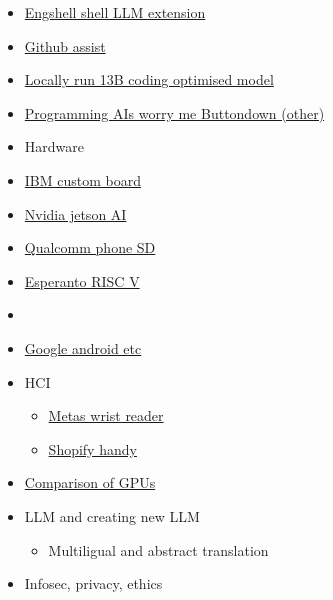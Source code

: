 \begin{itemize}
\item
  \href{https://github.com/emcf/engshell/tree/main}{Engshell shell LLM
  extension}
\item
  \href{https://useadrenaline.com/app}{Github assist}
\item
  \href{https://huggingface.co/ehartford/alpaca1337-13b-4bit/tree/main}{Locally
  run 13B coding optimised model}
\item
  \href{https://buttondown.email/hillelwayne/archive/programming-ais-worry-me/}{Programming
  AIs worry me   Buttondown (other)}
\item
  Hardware
\item
  \href{https://www.marktechpost.com/2022/10/27/ibm-research-introduces-artificial-intelligence-unit-aiu-its-first-complete-system-on-chip-designed-to-run-and-train-deep-learning-models-faster-and-more-efficiently-than-a-general-purpose-cpu/}{IBM
  custom board}
\item
  \href{https://www.okdo.com/p/nvidia-jetson-agx-orin-64gb-developer-kit/}{Nvidia
  jetson AI}
\item
  \href{https://www.theverge.com/2023/2/23/23611668/ai-image-stable-diffusion-mobile-android-qualcomm-fastest}{Qualcomm
  phone SD}
\item
  \href{https://www.esperanto.ai/}{Esperanto RISC V}
\item
  \href{https://hdh4797.wixsite.com/dhan/project-1}{}
\item
  \href{https://developers.google.com/learn/topics/on-device-ml}{Google
  android etc}
\item
  HCI

  \begin{itemize}
   
  \item
    \href{https://www.from-the-interface.com/wrist-interfaces/}{Meta\textquotesingle s
    wrist reader}
  \item
    \href{https://github.com/Shopify/handy}{Shopify handy}
  \end{itemize}
\item
  \href{https://timdettmers.com/2023/01/16/which-gpu-for-deep-learning/}{Comparison
  of GPUs}
\item
  LLM and creating new LLM

  \begin{itemize}
   
  \item
    Multiligual and abstract translation
  \end{itemize}
\item
  Infosec, privacy, ethics


\end{itemize}
